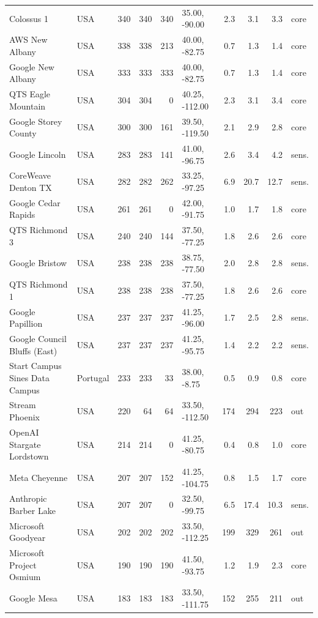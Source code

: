 \begin{footnotesize}
\begin{longtable}{@{}p{46mm}lrrrlrrrl@{}}
Colossus 1 & USA & 340 & 340 & 340 & 35.00, -90.00 & 2.3 & 3.1 & 3.3 & core \\
AWS New Albany & USA & 338 & 338 & 213 & 40.00, -82.75 & 0.7 & 1.3 & 1.4 & core \\
Google New Albany & USA & 333 & 333 & 333 & 40.00, -82.75 & 0.7 & 1.3 & 1.4 & core \\
QTS Eagle Mountain & USA & 304 & 304 & 0 & 40.25, -112.00 & 2.3 & 3.1 & 3.4 & core \\
Google Storey County & USA & 300 & 300 & 161 & 39.50, -119.50 & 2.1 & 2.9 & 2.8 & core \\
Google Lincoln & USA & 283 & 283 & 141 & 41.00, -96.75 & 2.6 & 3.4 & 4.2 & sens. \\
CoreWeave Denton TX & USA & 282 & 282 & 262 & 33.25, -97.25 & 6.9 & 20.7 & 12.7 & sens. \\
Google Cedar Rapids & USA & 261 & 261 & 0 & 42.00, -91.75 & 1.0 & 1.7 & 1.8 & core \\
QTS Richmond 3 & USA & 240 & 240 & 144 & 37.50, -77.25 & 1.8 & 2.6 & 2.6 & core \\
Google Bristow & USA & 238 & 238 & 238 & 38.75, -77.50 & 2.0 & 2.8 & 2.8 & sens. \\
QTS Richmond 1 & USA & 238 & 238 & 238 & 37.50, -77.25 & 1.8 & 2.6 & 2.6 & core \\
Google Papillion & USA & 237 & 237 & 237 & 41.25, -96.00 & 1.7 & 2.5 & 2.8 & sens. \\
Google Council Bluffs (East) & USA & 237 & 237 & 237 & 41.25, -95.75 & 1.4 & 2.2 & 2.2 & sens. \\
Start Campus Sines Data Campus & Portugal & 233 & 233 & 33 & 38.00, -8.75 & 0.5 & 0.9 & 0.8 & core \\
Stream Phoenix & USA & 220 & 64 & 64 & 33.50, -112.50 & 174 & 294 & 223 & out \\
OpenAI Stargate Lordstown & USA & 214 & 214 & 0 & 41.25, -80.75 & 0.4 & 0.8 & 1.0 & core \\
Meta Cheyenne & USA & 207 & 207 & 152 & 41.25, -104.75 & 0.8 & 1.5 & 1.7 & core \\
Anthropic Barber Lake & USA & 207 & 207 & 0 & 32.50, -99.75 & 6.5 & 17.4 & 10.3 & sens. \\
Microsoft Goodyear & USA & 202 & 202 & 202 & 33.50, -112.25 & 199 & 329 & 261 & out \\
Microsoft Project Osmium & USA & 190 & 190 & 190 & 41.50, -93.75 & 1.2 & 1.9 & 2.3 & core \\
Google Mesa & USA & 183 & 183 & 183 & 33.50, -111.75 & 152 & 255 & 211 & out \\

\end{longtable}
\end{footnotesize}
